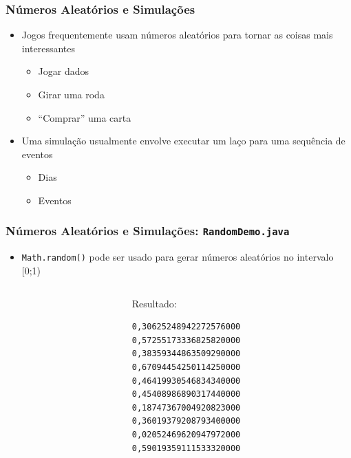 \documentclass[xcolor={dvipsnames,table},aspectratio=169]{beamer}
\begin{document}
\begin{frame}\frametitle{Números Aleatórios e Simulações}
\begin{itemize}
	\item Jogos frequentemente usam números aleatórios para tornar as coisas mais interessantes
	\begin{itemize}
		\item Jogar dados
		\item Girar uma roda
		\item ``Comprar'' uma carta
	\end{itemize}
	\item Uma simulação usualmente envolve executar um laço para uma sequência de eventos
	\begin{itemize}
		\item Dias
		\item Eventos
	\end{itemize}
\end{itemize}
\end{frame}

\begin{frame}[fragile]\frametitle{Números Aleatórios e Simulações: \texttt{RandomDemo.java}}
\begin{itemize}
	\item \texttt{Math.random()} pode ser usado para gerar números aleatórios no intervalo [0;1)
\end{itemize}
\begin{columns}[T]
	\begin{column}{0.74\linewidth}
		\scriptsize{\inputminted[bgcolor=cyan!10]{java}{src/RandomDemo.java}}
	\end{column}
	\begin{column}{0.26\linewidth}
{\scriptsize
Resultado:
\begin{verbatim}
0,30625248942272576000
0,57255173336825820000
0,38359344863509290000
0,67094454250114250000
0,46419930546834340000
0,45408986890317440000
0,18747367004920823000
0,36019379208793400000
0,02052469620947972000
0,59019359111533320000
\end{verbatim}
}
	\end{column}
\end{columns}
\end{frame}
\end{document}
